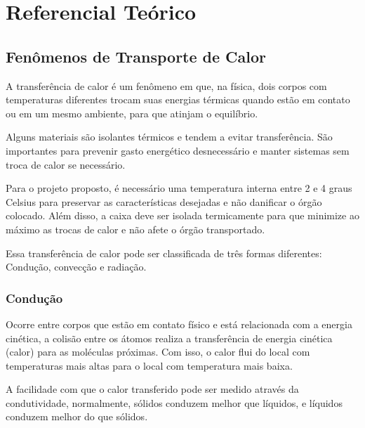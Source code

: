 \chapter[Referencial Teórico]{Referencial Teórico}

\section{Fenômenos de Transporte de Calor}

A transferência de calor é um fenômeno em que, na física, dois corpos com temperaturas diferentes trocam suas energias térmicas quando estão em contato ou em um mesmo ambiente, para que atinjam o equilíbrio.

Alguns materiais são isolantes térmicos e tendem a evitar transferência. São importantes para prevenir gasto energético desnecessário e manter sistemas sem troca de calor se necessário.

Para o projeto proposto, é necessário uma temperatura interna entre 2 e 4 graus Celsius para preservar as características desejadas e não danificar o órgão colocado. Além disso, a caixa deve ser isolada termicamente para que minimize ao máximo as trocas de calor e não afete o órgão transportado.

Essa transferência de calor pode ser classificada de três formas diferentes: Condução, convecção e radiação.

\subsection{Condução}
Ocorre entre corpos que estão em contato físico e está relacionada com a energia cinética, a colisão entre os átomos realiza a transferência de energia cinética (calor) para as moléculas próximas. Com isso, o calor flui do local com temperaturas mais altas para o local com temperatura mais baixa.

A facilidade com que o calor transferido pode ser medido através da condutividade, normalmente, sólidos conduzem melhor que líquidos, e líquidos conduzem melhor do que sólidos.

